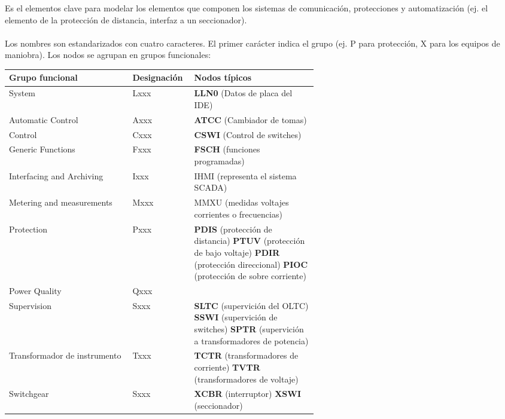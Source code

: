 \documentclass[a5paper]{book}%
\begin{document}
Es el elementos clave para modelar los elementos que componen los sistemas de comunicación, protecciones y automatización (ej. el elemento de la protección de distancia, interfaz a un seccionador).\\\\
Los nombres son estandarizados con cuatro caracteres. El primer carácter indica el grupo  (ej. P para protección, X para los equipos de maniobra). Los nodos se agrupan en grupos funcionales:

\begin{table}[H]
  \centering
  \begin{tabular}{|l | p{0.2\linewidth} |p{0.4\linewidth}|}
    \hline
    Grupo funcional & Designación & Nodos típicos \\\hline
    System & Lxxx & \textbf{LLN0} (Datos de placa del IDE) \\\hline
    Automatic Control & Axxx & \textbf{ATCC} (Cambiador de tomas) \\\hline
    Control & Cxxx & \textbf{CSWI}  (Control de switches)  \\\hline
    Generic Functions & Fxxx & \textbf{FSCH} (funciones programadas) \\\hline
    Interfacing and Archiving & Ixxx & IHMI (representa el sistema SCADA) \\\hline
    Metering  and measurements & Mxxx & MMXU (medidas voltajes corrientes  o frecuencias) \\\hline
    Protection & Pxxx & \textbf{PDIS} (protección de distancia) \textbf{PTUV} (protección de bajo voltaje) \textbf{PDIR} (protección direccional) \textbf{PIOC} (protección de sobre corriente)\\\hline

    Power Quality & Qxxx & \\\hline
    Supervision & Sxxx & \textbf{SLTC} (supervición del OLTC) \textbf{SSWI} (supervición de switches) \textbf{SPTR} (supervición a transformadores de potencia) \\\hline

    Transformador de instrumento & Txxx  & \textbf{TCTR} (transformadores de corriente) \textbf{TVTR} (transformadores de voltaje) \\\hline

    Switchgear & Sxxx & \textbf{XCBR} (interruptor) \textbf{XSWI} (seccionador) \\\hline

    
    \end{tabular}
  \end{table}
\end{document}
